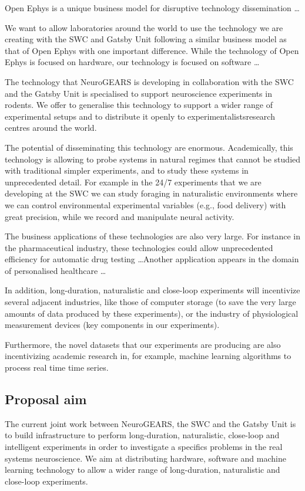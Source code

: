 Open Ephys is a unique business model for disruptive technology dissemination
\ldots

We want to allow laboratories around the world to use the technology we are
creating with the SWC and Gatsby Unit following a similar business model as
that of Open Ephys with one important difference. While the technology of Open
Ephys is focused on hardware, our technology is focused on software \ldots

The technology that NeuroGEARS is developing in collaboration with the SWC and
the Gatsby Unit is specialised to support neuroscience experiments in rodents.
We offer to generalise this technology to support a wider range of experimental
setups and to distribute it openly to experimentalistsresearch centres around
the world.

The potential of disseminating this technology are enormous. Academically,
this technology is allowing to probe systems in natural regimes that cannot
be studied with traditional simpler experiments, and to study these systems in
unprecedented detail. For example in the 24/7 experiments that we
are developing at the SWC we can study foraging in naturalistic environments
where we can control environmental experimental variables (e.g., food delivery)
with great precision, while we record and manipulate neural activity.

The business applications of these technologies are also very large. For
instance in the pharmaceutical industry, these technologies could allow
unprecedented efficiency for automatic drug testing \ldots Another application
appears in the domain of personalised healthcare \ldots

In addition, long-duration, naturalistic and close-loop experiments will
incentivize several adjacent industries, like those of computer storage (to
save the very large amounts of data produced by these experiments), or the
industry of physiological measurement devices (key components in our
experiments).

Furthermore, the novel datasets that our experiments are producing are also
incentivizing academic research in, for example, machine learning algorithms to
process real time time series.

\subsection{Proposal aim}

The current joint work between NeuroGEARS, the SWC and the Gatsby Unit is to
build infrastructure to perform long-duration, naturalistic, close-loop and
intelligent experiments in order to investigate a specifics problems in the
real systems neuroscience. We aim at distributing hardware, software and
machine learning technology to allow a wider range of long-duration,
naturalistic and close-loop experiments.
